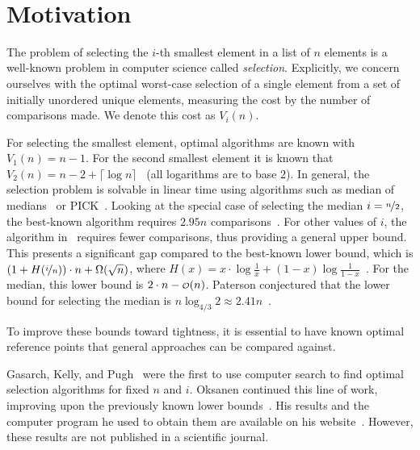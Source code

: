 \documentclass[twoside,leqno,twocolumn]{article}
\newcommand\smallO{
\mathchoice
{{\scriptstyle\mathcal{O}}}%
{{\scriptstyle\mathcal{O}}}%
{{\scriptscriptstyle\mathcal{O}}}%
{\scalebox{.50}{$\scriptscriptstyle\mathcal{O}$}}%
}
\begin{document}
\newpage~
\newpage

\section{Motivation} \label{sec:motivation}

The problem of selecting the $i$-th smallest element in a list of $n$ elements is a well-known problem in computer science called \textit{selection}.
Explicitly, we concern ourselves with the optimal worst-case selection of a single element from a set of initially unordered unique elements, measuring the cost by the number of comparisons made.
We denote this cost as $V_i(n)$.

For selecting the smallest element, optimal algorithms are known with $V_1(n) = n - 1$.
For the second smallest element it is known that $V_2(n) = n - 2 + \lceil \log n\rceil$~\cite{Knuth1973} (all logarithms are to base $2$).
In general, the selection problem is solvable in linear time using algorithms such as median of medians~\cite{Schoening1993} or PICK~\cite{Blum1972}.
Looking at the special case of selecting the median $i = \nicefrac{n}{2}$, the best-known algorithm requires $2.95n$ comparisons~\cite{dor1999selecting}. %
For other values of $i$, the algorithm in~\cite{dor1999selecting} requires fewer comparisons, thus providing a general upper bound.
This presents a significant gap compared to the best-known lower bound, which is $\left (1 + H(\nicefrac{i}{n}) \right ) \cdot n + \Omega(\sqrt n)$, where $H(x) = x \cdot \log \frac{1}{x} + (1 - x) \log \frac{1}{1 - x}$~\cite{bent1985finding}.
For the median, this lower bound is $2 \cdot n - \smallO(n)$.
Paterson conjectured that the lower bound for selecting the median is $n \log_{4/3} 2 \approx 2.41n$~\cite{paterson1996progress}.

To improve these bounds toward tightness, it is essential to have known optimal reference points that general approaches can be compared against.

Gasarch, Kelly, and Pugh~\cite{Gasarch1996} were the first to use computer search to find optimal selection algorithms for fixed $n$ and $i$.
Oksanen continued this line of work, improving upon the previously known lower bounds~\cite{Oksanen2006}.
His results and the computer program he used to obtain them are available on his website~\cite{Oksanen}.
However, these results are not published in a scientific journal.
\end{document}
